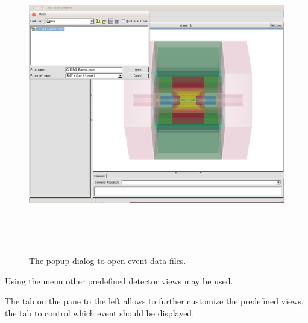 \documentclass[10pt,a4paper]{article}
\begin{document}
\begin{figure}[h]
  \begin{center}
    \includegraphics[height=130mm] {DDEve_4.png}
    \caption{The popup dialog to open event data files.}
    \label{fig:DDEve_4.png}
  \end{center}
\end{figure}
Using the  menu other predefined detector views may be used.

\newpage
\noindent 
The  tab on the pane to the left allows to further customize the 
predefined views, the  tab to control which event should 
be displayed.
\end{document}

